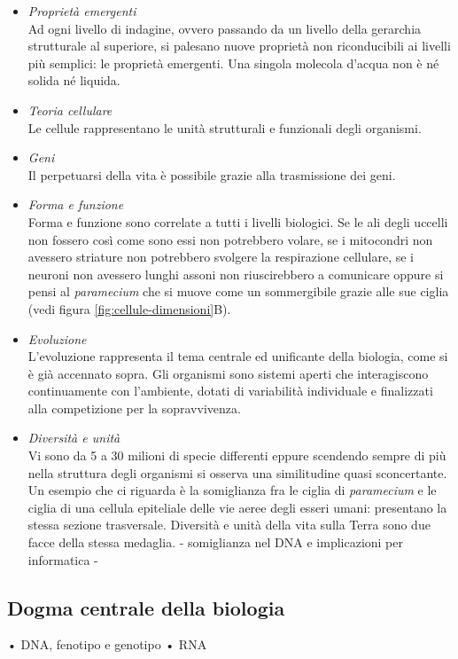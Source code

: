 \begin{itemize}
	\item \textit{Proprietà emergenti }\\
			Ad ogni livello di indagine, ovvero passando da un livello della gerarchia strutturale al superiore, si palesano nuove proprietà non riconducibili ai livelli più semplici: le proprietà emergenti. Una singola molecola d'acqua non è né solida né liquida.
	\item \textit{Teoria cellulare} \\
			Le cellule rappresentano le unità strutturali e funzionali degli organismi.
	\item \textit{Geni} \\
			Il perpetuarsi della vita è possibile grazie alla trasmissione dei geni.
	\item \textit{Forma e funzione} \\
			Forma e funzione sono correlate a tutti i livelli biologici. Se le ali degli uccelli non fossero così come sono essi non potrebbero volare, se i mitocondri non avessero striature non potrebbero svolgere la respirazione cellulare, se i neuroni non avessero lunghi assoni non riuscirebbero a comunicare oppure si pensi al \textit{paramecium} che si muove come un sommergibile grazie alle sue ciglia (vedi figura \ref{fig:cellule-dimensioni}B).
	\item \textit{Evoluzione} \\
			L'evoluzione rappresenta il tema centrale ed unificante della biologia, come si è già accennato sopra. Gli organismi sono sistemi aperti che interagiscono continuamente con l'ambiente, dotati di variabilità individuale e finalizzati alla competizione per la sopravvivenza. 
	\item \textit{Diversità e unità} \\
			Vi sono da 5 a 30 milioni di specie differenti eppure scendendo sempre di più nella struttura degli organismi si osserva una similitudine quasi sconcertante. Un esempio che ci riguarda è la somiglianza fra le ciglia di \textit{paramecium} e le ciglia di una cellula epiteliale delle vie aeree degli esseri umani: presentano la stessa sezione trasversale. Diversità e unità della vita sulla Terra sono due facce della stessa medaglia.
			- somiglianza nel DNA e implicazioni per informatica - 
			
\end{itemize}

\subsection{Dogma centrale della biologia}
• DNA, fenotipo e genotipo
• RNA

